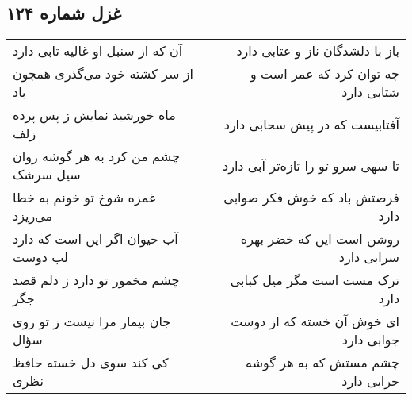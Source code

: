 \begin{center}
\section*{غزل شماره ۱۲۴}
\label{sec:sh124}
\begin{longtable}{l p{0.5cm} r}
آن که از سنبل او غالیه تابی دارد
&&
باز با دلشدگان ناز و عتابی دارد
\\
از سر کشته خود می‌گذری همچون باد
&&
چه توان کرد که عمر است و شتابی دارد
\\
ماه خورشید نمایش ز پس پرده زلف
&&
آفتابیست که در پیش سحابی دارد
\\
چشم من کرد به هر گوشه روان سیل سرشک
&&
تا سهی سرو تو را تازه‌تر آبی دارد
\\
غمزه شوخ تو خونم به خطا می‌ریزد
&&
فرصتش باد که خوش فکر صوابی دارد
\\
آب حیوان اگر این است که دارد لب دوست
&&
روشن است این که خضر بهره سرابی دارد
\\
چشم مخمور تو دارد ز دلم قصد جگر
&&
ترک مست است مگر میل کبابی دارد
\\
جان بیمار مرا نیست ز تو روی سؤال
&&
ای خوش آن خسته که از دوست جوابی دارد
\\
کی کند سوی دل خسته حافظ نظری
&&
چشم مستش که به هر گوشه خرابی دارد
\\
\end{longtable}
\end{center}
